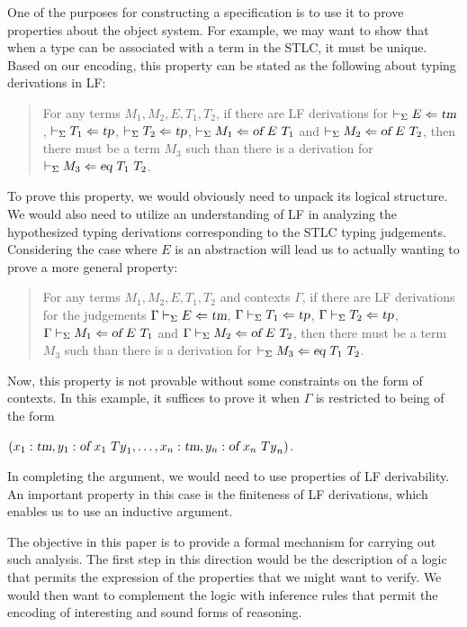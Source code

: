 One of the purposes for constructing a specification is to use it to
prove properties about the object system.
%
For example, we may want to show that when a type can be associated
with a term in the STLC, it must be unique.
%
Based on our encoding, this property can be stated as the following
about typing derivations in LF:
\begin{quotation}
\noindent For any terms $M_1,M_2,E,T_1,T_2$, if there are LF
derivations for
$\vdash_{\Sigma} E\Leftarrow \mbox{\sl tm}$, $\vdash_{\Sigma} T_1\Leftarrow \mbox{\sl tp}$,
$\vdash_{\Sigma} T_2\Leftarrow \mbox{\sl tp}$,
$\vdash_{\Sigma} M_1\Leftarrow \mbox{\sl of}\  E\  T_1$ and
$\vdash_{\Sigma} M_2\Leftarrow \mbox{\sl of}\  E\  T_2$, then there must be a term
$M_3$ such than there is a derivation for
$\vdash_{\Sigma} M_3\Leftarrow \mbox{\sl eq}\  T_1\  T_2$. 
\end{quotation}
To prove this property, we would obviously need to unpack its logical
structure.
%
We would also need to utilize an understanding of LF in
analyzing the hypothesized typing derivations corresponding to the
STLC typing judgements. 
%
Considering the case where $E$ is an abstraction will lead us to actually
wanting to prove a more general property:
\begin{quotation}
\noindent For any terms $M_1,M_2,E,T_1,T_2$ and contexts $\Gamma$, if
there are LF derivations for the judgements
$\Gamma \vdash_{\Sigma} E\Leftarrow \mbox{\sl tm}$, $\Gamma \vdash_{\Sigma} T_1\Leftarrow \mbox{\sl tp}$,
$\Gamma \vdash_{\Sigma} T_2\Leftarrow \mbox{\sl tp}$,
$\Gamma \vdash_{\Sigma} M_1\Leftarrow \mbox{\sl of}\  E\  T_1$ and
$\Gamma \vdash_{\Sigma} M_2\Leftarrow \mbox{\sl of}\  E\  T_2$, 
then there must be a term $M_3$ such than there is a derivation
for $\vdash_{\Sigma} M_3\Leftarrow \mbox{\sl eq}\  T_1\  T_2$. 
\end{quotation}
Now, this property is not provable without some constraints on the form
of contexts.
%
In this example, it suffices to prove it when $\Gamma$ is restricted
to being of the form
\begin{center}
 $(x_1:\mbox{\sl tm},y_1:\mbox{\sl of}\  x_1\ {Ty}_1,\ldots,x_n:\mbox{\sl tm},y_n:\mbox{\sl of}\  x_n\ {Ty}_n)$.
\end{center}
%
\noindent In completing the argument, we would need to use properties of LF
derivability.
%
An important property in this case is the finiteness of
LF derivations, which enables us to use an inductive argument.

The objective in this paper is to provide a formal mechanism for
carrying out such analysis.
%
The first step in this direction would be the description of a logic
that permits the expression of the properties that we might want to
verify. 
%
We would then want to complement the logic with inference rules that 
permit the encoding of interesting and sound forms of reasoning. 

